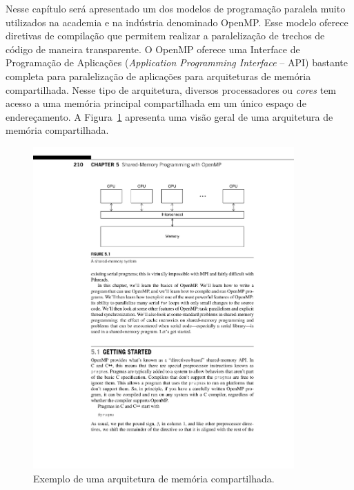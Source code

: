 \documentclass{SBCbookchapter}
\begin{document}
Nesse capítulo será apresentado um dos modelos de programação paralela muito utilizados na academia e na indústria denominado OpenMP. Esse modelo oferece diretivas de compilação que permitem realizar a paralelização de trechos de código de maneira transparente. O OpenMP oferece uma Interface de Programação de Aplicações (\textit{Application Programming Interface} -- API) bastante completa para paralelização de aplicações para arquiteturas de memória compartilhada. Nesse tipo de arquitetura, diversos processadores ou \textit{cores} tem acesso a uma memória principal compartilhada em um único espaço de endereçamento. A Figura~\ref{fig:arquitetura-multicore} apresenta uma visão geral de uma arquitetura de memória compartilhada.

\begin{figure}[h]
\begin{center}
\includegraphics[width=10cm, height=!]{figs/arquitetura-multicore.pdf}
\caption{Exemplo de uma arquitetura de memória compartilhada.}\label{fig:arquitetura-multicore}
\end{center}
\end{figure}
\end{document}
